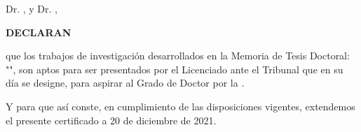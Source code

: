 \thispagestyle{empty}





\justifying
Dr. \textbf\thesisFirstSupervisor, y Dr. \textbf\thesisSecondSupervisor, 

\vspace{8ex}
\raggedright
\textbf{DECLARAN}
\vspace{4ex}

\justifying
que los trabajos de investigación desarrollados en la Memoria de Tesis Doctoral: "\textit{\thesisTitle}", son aptos para ser presentados por el Licenciado \thesisName \xspace ante el Tribunal que en su día se designe, para aspirar al Grado de Doctor por la \thesisUniversity. 


\vspace{2ex}
\justifying
Y para que así conste, en cumplimiento de las disposiciones vigentes, extendemos el presente certificado a 20 de diciembre de 2021.

